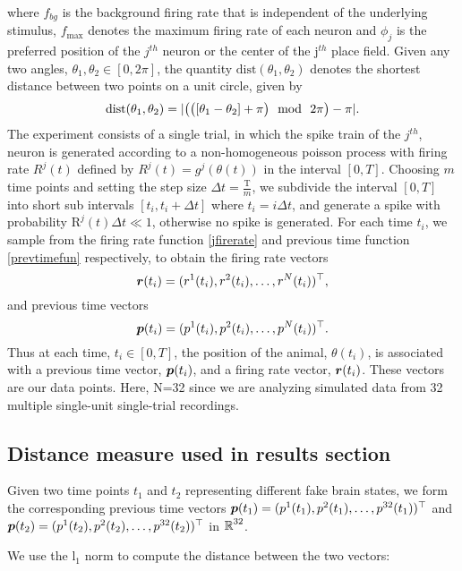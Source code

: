 where $f_{bg}$ is the background firing rate that is independent of the underlying stimulus, $f_{\max}$ denotes the maximum firing rate of each 
neuron and $\phi_{j}$ is the preferred position of the $j^{th}$ 
neuron or the center of the j$^{th}$ place field.
Given any two angles, $\theta_{1}, \theta_{2} \in [0, 2\pi]$, the quantity
$\text{dist}(\theta_{1}, \theta_{2})$ denotes the shortest distance between 
two points on a unit circle, given by
\[
\text{dist}(\theta_{1}, \theta_{2}) = \abs{\big( \big( [\theta_{1} - \theta_{2}] + \pi  \big) \ \ \text{mod} \ \ 2\pi \big) - \pi}.
\]
The experiment consists of a single trial, in which the spike train of the $j^{th}$, neuron is generated according to a non-homogeneous poisson process with firing rate $R^{j}(t)$ defined by $R^{j}(t) = g^{j}(\theta(t))$ in the interval $[0, T]$. Choosing $m$ time points and setting the step size $\Delta t = \frac{\text{T}}{m}$, we subdivide the interval $[0, T]$ into short sub intervals $[t_{i}, t_{i} + \Delta t]$ where $t_{i} = i \Delta t$, and generate
a spike with probability $\text{R}^{j}(t)\Delta t \ll 1$, otherwise no spike is generated.
For each time $t_{i}$, we sample from  the firing rate function \eqref{jfirerate} and  previous time function \eqref{prevtimefun} respectively, to obtain the firing rate vectors 
\[ \boldsymbol{r}(t_{i}) = (r^{1}(t_{i}), r^{2}(t_{i}), \ldots, r^{N}(t_{i}))^{\top},
\]
and previous time vectors
\[
\boldsymbol{p}(t_{i}) = (p^{1}(t_{i}), p^{2}(t_{i}), \ldots, p^{N}(t_{i}))^{\top}.
\]
Thus at each time, $t_{i} \in [0,T]$, the position of the animal, $\theta(t_{i})$, is associated with a previous time vector, $\boldsymbol{p}(t_{i})$,
and a firing rate vector, $\boldsymbol{r}(t_{i})$.
These vectors are our data points.  Here, N=32 since we are analyzing simulated data from 32 multiple single-unit single-trial recordings.



\subsection{Distance measure used in results section}
Given two time points $t_{1}$ and $t_{2}$ representing different fake brain states, we form the corresponding previous time vectors $\boldsymbol{p}(t_{1})= (p^{1}(t_{1}), p^{2}(t_{1}), \ldots, p^{32}(t_{1}))^{\top} $  and  $\boldsymbol{p}(t_{2}) = (p^{1}(t_{2}), p^{2}(t_{2}), \ldots, p^{32}(t_{2}))^{\top}$ in $\operatorname{\mathbb{R}}^{32}$.

We use the l$_{1}$ norm to compute the distance between the two vectors:

